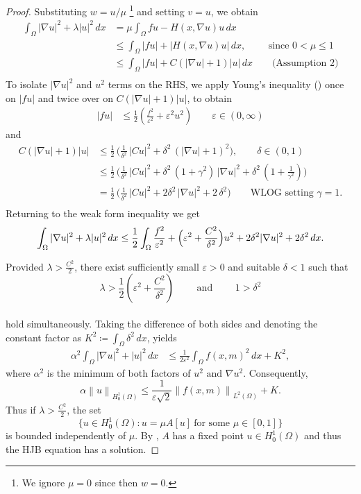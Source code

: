 \documentclass[11pt]{article}
\numberwithin{equation}{section}
\theoremstyle{definition}
\theoremstyle{remark}
\newcommand{\Ltwo}{L^2(\Omega)}
\newcommand{\Honez}{H_0^1(\Omega)}
\newcommand{\norm}[1]{\left\lVert #1 \right\rVert}
\begin{document}
\begin{proof}
  Substituting $w =u/\mu$ \footnote{\label{fn:mu} We ignore $\mu =0$ since then $w=0$.} and setting $v = u$, we obtain
  \begin{align*}
    \int_\Omega |\nabla u|^2 + \lambda |u|^2\,dx
    &= \mu\int_\Omega f u - H(x,\nabla u)u\,dx\\
    &\le \int_\Omega |fu| + |H(x,\nabla u)u|\,dx, \qquad \text{ since } 0< \mu \le 1\\
    &\le \int_\Omega |fu| + C(|\nabla u|+1)|u|\,dx \qquad \text{(Assumption 2)}\\
  \end{align*}
  To isolate $|\nabla u|^2$ and $u^2$ terms on the RHS, we apply Young's inequality () once on $|fu|$ and twice over on $C(|\nabla u|+1)|u|$, to obtain
  \begin{align*}
    |fu|
    &\le \frac12(\frac{f^2}{\varepsilon^2} + \varepsilon^2 u^2) \qquad \varepsilon\in (0, \infty)
  \end{align*}
  and
  \begin{align*}
    C(|\nabla u|+1)|u|
    &\le \frac12\,\bigl(\frac{1}{\delta^2}\,|Cu|^2 + \delta^2\,(|\nabla u|+1)^2 \bigr), \qquad \delta\in(0,1)\\[0.9em]
    &\le \frac12\,\bigl(\frac{1}{\delta^2}\,|Cu|^2 + \delta^2\,(1+\gamma^2)\,|\nabla u|^2 + \delta^2\,(1+\frac{1}{\gamma^2})\bigr)\\[0.9em]
    & = \frac12\,\bigl(\frac{1}{\delta^2}\,|Cu|^2 + 2\delta^2\,|\nabla u|^2 + 2\,\delta^2\bigr) \qquad \text{WLOG setting } \gamma = 1.\\
  \end{align*}
  Returning to the weak form inequality  we get
  \begin{align*}
    \int_\Omega |\nabla u|^2 + \lambda |u|^2\,dx
    &\le \frac12\int_\Omega \frac{f^2}{\varepsilon^2} + \Bigl(\varepsilon^2+\frac{C^2}{\delta^2}\Bigr)u^2
    + 2\delta^2|\nabla u|^2 + 2\delta^2\,dx.\\
  \end{align*}

  Provided $\lambda>\frac{C^2}{2}$, there exist sufficiently small $\varepsilon> 0$ and suitable $\delta < 1$ such that
  \[\lambda > \frac12(\varepsilon^2 + \frac{C^2}{\delta^2}) \qquad\text{ and } \qquad1 > \delta^2\]\\
  hold simultaneously.
  Taking the difference of both sides and denoting the constant factor as $K^2 \coloneqq \int_\Omega \delta^2 \,dx$, yields 
  \begin{align*}
      \alpha^2 \int_\Omega |\nabla u|^2 + |u|^2\,dx
      &\le \frac{1}{2\varepsilon ^2}\int_\Omega f(x,m)^2 \,dx + K^2,
    \end{align*}
  where $\alpha^2$ is the minimum of both factors of $u^2\text{ and } \nabla u^2$. 
Consequently, 
\[\alpha \norm{u}_{\Honez} \le \frac{1}{\varepsilon\sqrt{2}} \norm{f(x,m)}_{\Ltwo}+ K.\]
Thus if $\lambda>\frac{C^2}{2}$, the set 
\[\{u\in \Honez: u=\mu A[u]\ \text{for some } \mu \in[0,1]\}\]
is bounded independently of $\mu$. By , $A$ has a fixed point $u \in \Honez$ and thus the HJB equation has a solution.
\end{proof}
\end{document}
